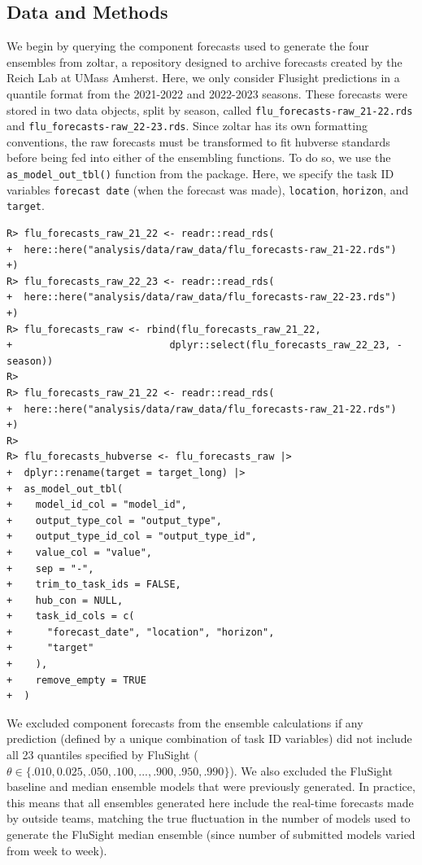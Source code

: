 \documentclass[
  article,
  shortnames,
  notitle]{jss}
\begin{document}
\subsection{Data and Methods}\label{data-and-methods}

We begin by querying the component forecasts used to generate the four
ensembles from zoltar, a repository designed to archive forecasts
created by the Reich Lab at UMass Amherst. Here, we only consider
Flusight predictions in a quantile format from the 2021-2022 and
2022-2023 seasons. These forecasts were stored in two data objects,
split by season, called \texttt{flu\_forecasts-raw\_21-22.rds} and
\texttt{flu\_forecasts-raw\_22-23.rds}. Since zoltar has its own
formatting conventions, the raw forecasts must be transformed to fit
hubverse standards before being fed into either of the ensembling
functions. To do so, we use the \texttt{as\_model\_out\_tbl()} function
from the  package. Here, we specify the task ID variables
\texttt{forecast\ date} (when the forecast was made), \texttt{location},
\texttt{horizon}, and \texttt{target}.

\begin{verbatim}
R> flu_forecasts_raw_21_22 <- readr::read_rds(
+  here::here("analysis/data/raw_data/flu_forecasts-raw_21-22.rds")
+)
R> flu_forecasts_raw_22_23 <- readr::read_rds(
+  here::here("analysis/data/raw_data/flu_forecasts-raw_22-23.rds")
+)
R> flu_forecasts_raw <- rbind(flu_forecasts_raw_21_22,
+                           dplyr::select(flu_forecasts_raw_22_23, -season))
R> 
R> flu_forecasts_raw_21_22 <- readr::read_rds(
+  here::here("analysis/data/raw_data/flu_forecasts-raw_21-22.rds")
+)
R> 
R> flu_forecasts_hubverse <- flu_forecasts_raw |>
+  dplyr::rename(target = target_long) |>
+  as_model_out_tbl(
+    model_id_col = "model_id",
+    output_type_col = "output_type",
+    output_type_id_col = "output_type_id",
+    value_col = "value",
+    sep = "-",
+    trim_to_task_ids = FALSE,
+    hub_con = NULL,
+    task_id_cols = c(
+      "forecast_date", "location", "horizon",
+      "target"
+    ),
+    remove_empty = TRUE
+  )
\end{verbatim}

We excluded component forecasts from the ensemble calculations if any
prediction (defined by a unique combination of task ID variables) did
not include all 23 quantiles specified by FluSight
(\(\theta \in \{.010, 0.025, .050, .100, ..., .900, .950, .990\}\)). We
also excluded the FluSight baseline and median ensemble models that were
previously generated. In practice, this means that all ensembles
generated here include the real-time forecasts made by outside teams,
matching the true fluctuation in the number of models used to generate
the FluSight median ensemble (since number of submitted models varied
from week to week).
\end{document}
